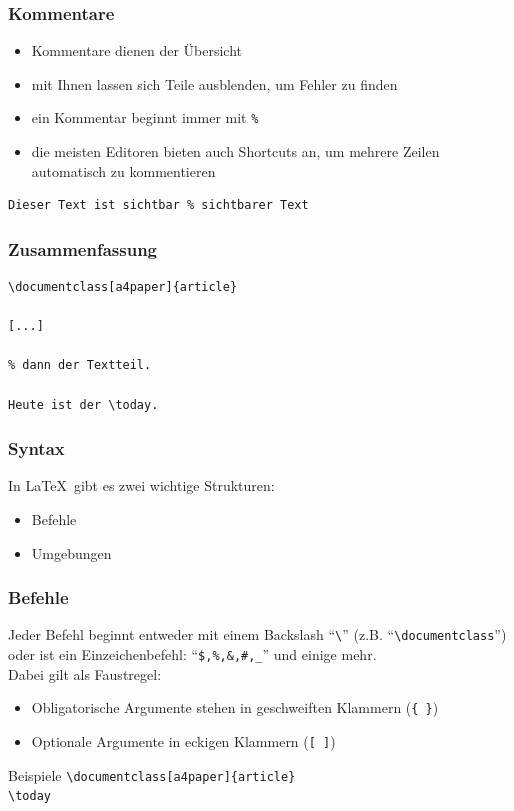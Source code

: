 \begin{frame}[fragile]
\frametitle{Kommentare}
\begin{itemize}[<+->]
  \item Kommentare dienen der Übersicht
  \item mit Ihnen lassen sich Teile ausblenden, um Fehler zu finden
  \item ein Kommentar beginnt immer mit \lstinline[style=Latex]+%+
  \item die meisten Editoren bieten auch Shortcuts an, um mehrere Zeilen automatisch zu kommentieren
\end{itemize}\pause
\begin{lstlisting}[style=Latex]
% Dokument von Max Mustermann
Dieser Text ist sichtbar % sichtbarer Text
\end{lstlisting}
\vspace{-20pt}
\pause
{}
\end{frame}

\begin{frame}[fragile,t]
\frametitle{Zusammenfassung}
\begin{lstlisting}[style=Latex]
% erst der Vorspann
\documentclass[a4paper]{article}

[...]

% dann der Textteil.

Heute ist der \today.

\end{lstlisting}
\pause
\vspace{-20pt}
\end{frame}
\begin{frame}[fragile]
\frametitle{Syntax}
\linespread{1.5}
In \LaTeX\, gibt es zwei wichtige Strukturen: \pause
\begin{itemize}[<+->]
  \item Befehle
  \item Umgebungen
\end{itemize}	
\end{frame}

\begin{frame}[fragile]
\frametitle{Befehle}
\linespread{1.5}
Jeder Befehl beginnt entweder mit einem Backslash ``\verb+\+'' (z.B. ``\lstinline[style=Latex]+\documentclass+'') 
oder ist ein Einzeichenbefehl: ``\texttt{\$,\%,\&,\#,\_}'' und einige mehr.\\ \pause
Dabei gilt als Faustregel:
\begin{itemize}[<+->]
  \item Obligatorische Argumente stehen in geschweiften Klammern (\lstinline[style=Latex]+{ }+)
  \item Optionale Argumente in eckigen Klammern (\lstinline[style=Latex]+[ ]+)
\end{itemize} \pause
\vfill
\begin{exampleblock}{Beispiele} \lstinline[style=Latex]+\documentclass[a4paper]{article}+ \\ \lstinline[style=Latex]+\today+
\end{exampleblock}
\end{frame}

